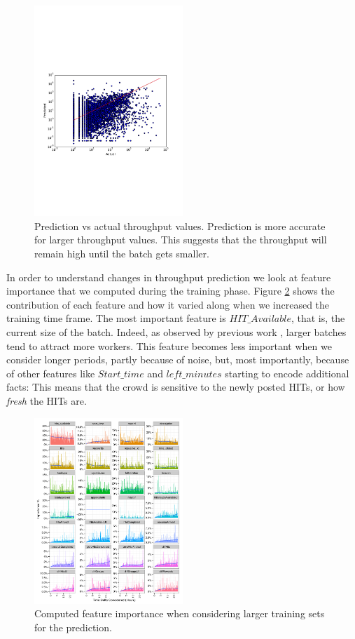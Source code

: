 \begin{figure}[tb]
	\centering
		\includegraphics[width=0.5\textwidth]{figures/predictions_3}
	\caption{Prediction vs actual throughput values. Prediction is more accurate for larger throughput values. This suggests that the throughput will remain high until the batch gets smaller.}
	\label{fig:pred}
\end{figure}

In order to understand  changes in throughput prediction we  look at  feature importance that we computed during   the training phase. Figure \ref{fig:importances} shows the  contribution of each feature and how it varied along when we increased the training time frame.
The most important feature is $HIT\_Available$, that is, the current size of the batch. Indeed, as observed by previous work , larger batches tend to attract more workers. This feature becomes less important when we consider longer periods, partly because of  noise, but, most importantly, because of other features like $Start\_time$ and $left\_minutes$ starting to encode additional facts: This means that the crowd is sensitive to the newly posted HITs, or how \emph{fresh} the HITs are.

\begin{figure}[tb]
	\centering
		\includegraphics[width=0.5\textwidth]{figures/importances}
	\caption{Computed feature importance when considering larger training sets for the prediction.}
	\label{fig:importances}
\end{figure}
